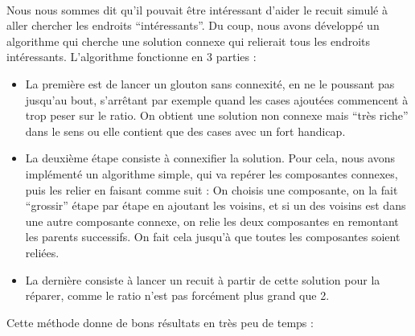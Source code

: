 \documentclass[a4paper, 11pt]{article} %
\begin{document}
\paragraph*{}
Nous nous sommes dit qu'il pouvait être intéressant d'aider le recuit simulé à aller chercher les endroits ``intéressants''. Du coup, nous avons développé un algorithme qui cherche une solution connexe qui relierait tous les endroits intéressants. L'algorithme fonctionne en 3 parties :
\begin{itemize}
\item La première est de lancer un glouton sans connexité, en ne le poussant pas jusqu'au bout, s'arrêtant par exemple quand les cases ajoutées commencent à trop peser sur le ratio. On obtient une solution non connexe mais ``très riche'' dans le sens ou elle contient que des cases avec un fort handicap.
\item La deuxième étape consiste à connexifier la solution. Pour cela, nous avons implémenté un algorithme simple, qui va repérer les composantes connexes, puis les relier en faisant comme suit : On choisis une composante, on la fait ``grossir'' étape par étape en ajoutant les voisins, et si un des voisins est dans une autre composante connexe, on relie les deux composantes en remontant les parents successifs. On fait cela jusqu'à que toutes les composantes soient reliées.
\item La dernière consiste à lancer un recuit à partir de cette solution pour la réparer, comme le ratio n'est pas forcément plus grand que 2.
\end{itemize}
Cette méthode donne de bons résultats en très peu de temps : 
\end{document}
